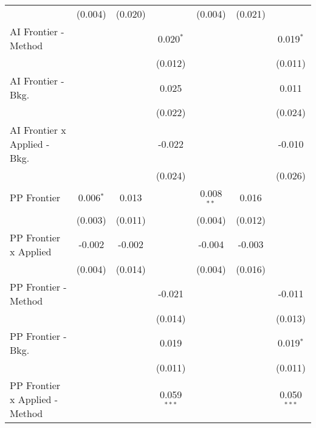 \begin{tabular}{lcccccc}
                                  & (0.004)       & (0.020)       &               & (0.004)       & (0.021)       &   \\   
   AI Frontier - Method           &               &               & 0.020$^{*}$   &               &               & 0.019$^{*}$\\   
                                  &               &               & (0.012)       &               &               & (0.011)\\   
   AI Frontier - Bkg.             &               &               & 0.025         &               &               & 0.011\\   
                                  &               &               & (0.022)       &               &               & (0.024)\\   
   AI Frontier x Applied - Bkg.   &               &               & -0.022        &               &               & -0.010\\   
                                  &               &               & (0.024)       &               &               & (0.026)\\   
   PP Frontier                    & 0.006$^{*}$   & 0.013         &               & 0.008$^{**}$  & 0.016         &   \\   
                                  & (0.003)       & (0.011)       &               & (0.004)       & (0.012)       &   \\   
   PP Frontier x Applied          & -0.002        & -0.002        &               & -0.004        & -0.003        &   \\   
                                  & (0.004)       & (0.014)       &               & (0.004)       & (0.016)       &   \\   
   PP Frontier - Method           &               &               & -0.021        &               &               & -0.011\\   
                                  &               &               & (0.014)       &               &               & (0.013)\\   
   PP Frontier - Bkg.             &               &               & 0.019         &               &               & 0.019$^{*}$\\   
                                  &               &               & (0.011)       &               &               & (0.011)\\   
   PP Frontier x Applied - Method &               &               & 0.059$^{***}$ &               &               & 0.050$^{***}$\\   

\end{tabular}
